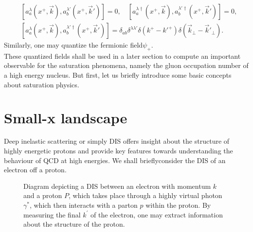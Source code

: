 \begin{equation*}
\begin{aligned}
&\left[a_a^\lambda(x^+,\vec{k}),a_b^{\lambda'}(x^+,\vec{k}')\right]=0,\quad \left[a_a^{\lambda\dag}(x^+,\vec{k}),a_b^{\lambda'\dag}(x^+,\vec{k}')\right]=0,\\
&\left[a_a^\lambda(x^+,\vec{k}),a_b^{\lambda'\dag}(x^+,\vec{k}')\right]=\delta_{ab}\delta^{\lambda\lambda'}\delta(k^+-k'^+)\delta\left(\vec{k}_\perp-\vec{k}'_\perp\right).
\end{aligned}
\end{equation*}
Similarly, one may quantize the fermionic field$\psi_+$. \\
These quantized fields shall be used in a later section to compute an important observable for the saturation phenomena, namely the gluon occupation number of a high energy nucleus. But first, let us briefly introduce some basic concepts about saturation physics.

\section{Small-x landscape}
Deep inelastic scattering or simply {\sffamily DIS} offers insight about the structure of highly energetic protons and provide key features towards understanding the behaviour of {\sffamily QCD} at high energies. We shall brieflyconsider the {\sffamily DIS} of an electron off a proton. 

\begin{figure}[!hbt]
	\centering
    
    \caption{\normalsize Diagram depicting a {\sffamily DIS} between an electron with momentum $k$ and a proton $P$, which takes place through a highly virtual photon $\gamma^*$, which then interacts with a parton $p$ within the proton. By measuring the final $k^\prime$ of the electron, one may extract information about the structure of the proton.}
\end{figure}

